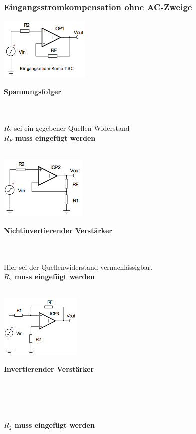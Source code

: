 		\subsubsection{Eingangsstromkompensation ohne AC-Zweige }
			\begin{minipage}[b]{6cm}
            	\includegraphics[height=3cm]{./bilder/spannungsfolger.png}\\
            	\centerline{{\bf Spannungsfolger}}\\ \\
            	$R_2$ sei ein gegebener Quellen-Widerstand\\
            	{\bf $R_F$ muss eingefügt werden}\\ \\
            \end{minipage}\hfill
			\begin{minipage}[b]{6cm}
            	\includegraphics[height=3cm]{./bilder/nichtinver}\\
            	\centerline{{\bf Nichtinvertierender Verstärker}}\\ \\
            	Hier sei der Quellenwiderstand
            	vernachlässigbar.\\ {\bf $R_2$ muss eingefügt werden}\\ \\
            \end{minipage}\hfill
			\begin{minipage}[b]{6cm}
            	\includegraphics[height=3cm]{./bilder/inver}\\
            	\centerline{{\bf Invertierender Verstärker}}\\ \\ \\ \\
            	{\bf $R_2$ muss eingefügt werden}\\ \\
            \end{minipage}
